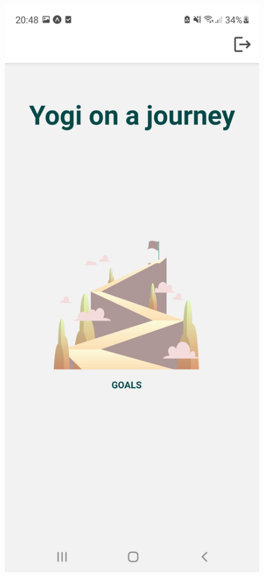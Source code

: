 \documentclass[a4paper, 12pt]{book}
\begin{document}
\begin{figure}[!ht]
\begin{minipage}[b]{0.325\textwidth}
    \label{menu}
  \end{minipage}
  \begin{minipage}[b]{0.325\textwidth}
    \includegraphics[width=\textwidth]{menu2.jpg}\centering

\end{minipage}
\end{figure}
\end{document}
